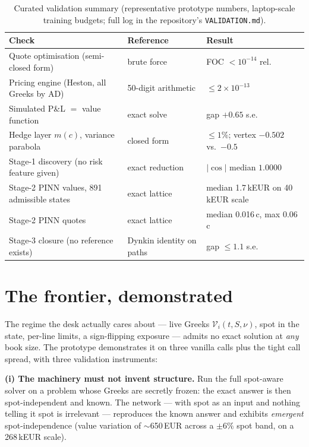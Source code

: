 \documentclass[11pt,a4paper]{article}
\begin{document}
\begin{table}[htbp]
\centering
\small
\begin{tabular}{lll}
\toprule
Check & Reference & Result \\
\midrule
Quote optimisation (semi-closed form) & brute force & FOC
  $<10^{-14}$ rel. \\
Pricing engine (Heston, all Greeks by AD) & 50-digit arithmetic &
  $\le 2\times10^{-13}$ \\
Simulated P\&L $=$ value function & exact solve & gap $+0.65$ s.e. \\
Hedge layer $m(c)$, variance parabola & closed form & $\le 1\%$;
  vertex $-0.502$ vs.\ $-0.5$ \\
Stage-1 discovery (no risk feature given) & exact reduction &
  $|\cos|$ median $1.0000$ \\
Stage-2 PINN values, 891 admissible states & exact lattice & median
  1.7\,kEUR on 40\,kEUR scale \\
Stage-2 PINN quotes & exact lattice & median 0.016\,c, max 0.06\,c \\
Stage-3 closure (no reference exists) & Dynkin identity on paths &
  gap $\le 1.1$ s.e. \\
\bottomrule
\end{tabular}
\caption{Curated validation summary (representative prototype numbers,
laptop-scale training budgets; full log in the repository's
\texttt{VALIDATION.md}).}
\label{tab:val}
\end{table}

\section{The frontier, demonstrated}

The regime the desk actually cares about --- live Greeks
$\mathcal V_i(t,S,\nu)$, spot in the state, per-line limits, a
sign-flipping exposure --- admits no exact solution at \emph{any} book
size. The prototype demonstrates it on three vanilla calls plus the tight
call spread, with three validation instruments:

\textbf{(i) The machinery must not invent structure.} Run the full
spot-aware solver on a problem whose Greeks are secretly frozen: the exact
answer is then spot-independent and known. The network --- with spot as an
input and nothing telling it spot is irrelevant --- reproduces the known
answer and exhibits \emph{emergent} spot-independence (value variation of
$\sim$650\,EUR across a $\pm6\%$ spot band, on a 268\,kEUR scale).
\end{document}
